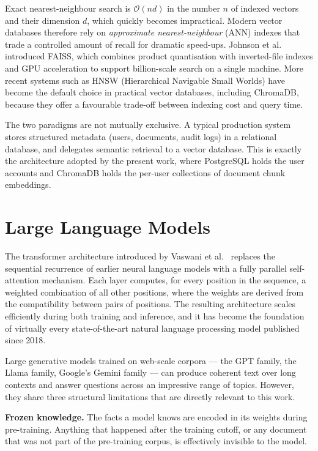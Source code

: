 Exact nearest-neighbour search is $\mathcal{O}(nd)$ in the number $n$ of
indexed vectors and their dimension $d$, which quickly becomes impractical.
Modern vector databases therefore rely on \emph{approximate nearest-neighbour}
(ANN) indexes that trade a controlled amount of recall for dramatic speed-ups.
Johnson et al.~\cite{Johnson2021FAISS} introduced FAISS, which combines
product quantisation with inverted-file indexes and GPU acceleration to
support billion-scale search on a single machine. More recent systems such as
HNSW (Hierarchical Navigable Small Worlds) have become the default choice in
practical vector databases, including ChromaDB, because they offer a
favourable trade-off between indexing cost and query time.

The two paradigms are not mutually exclusive. A typical production system
stores structured metadata (users, documents, audit logs) in a relational
database, and delegates semantic retrieval to a vector database. This is
exactly the architecture adopted by the present work, where PostgreSQL holds
the user accounts and ChromaDB holds the per-user collections of document
chunk embeddings.

\section{Large Language Models}
\label{sec:llms}

The transformer architecture introduced by Vaswani et
al.~\cite{Vaswani2017Attention} replaces the sequential recurrence of earlier
neural language models with a fully parallel self-attention mechanism. Each
layer computes, for every position in the sequence, a weighted combination of
all other positions, where the weights are derived from the compatibility
between pairs of positions. The resulting architecture scales efficiently
during both training and inference, and it has become the foundation of
virtually every state-of-the-art natural language processing model published
since 2018.

Large generative models trained on web-scale corpora --- the GPT family, the
Llama family, Google's Gemini family --- can produce coherent text over long
contexts and answer questions across an impressive range of topics. However,
they share three structural limitations that are directly relevant to this
work.

\textbf{Frozen knowledge.} The facts a model knows are encoded in its weights
during pre-training. Anything that happened after the training cutoff, or any
document that was not part of the pre-training corpus, is effectively
invisible to the model.

